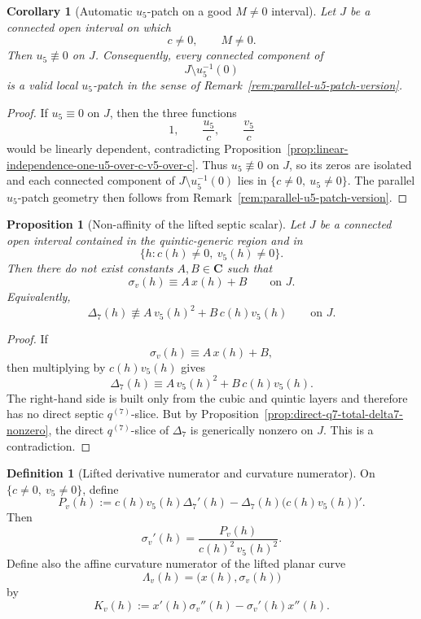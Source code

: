 \documentclass[11pt,a4paper]{amsart}
\theoremstyle{plain}
\newtheorem{proposition}[theorem]{Proposition}
\newtheorem{corollary}[theorem]{Corollary}
\theoremstyle{definition}
\newtheorem{definition}[theorem]{Definition}
\begin{document}
\begin{corollary}[Automatic $u_5$-patch on a good $M\neq 0$ interval]
\label{cor:automatic-u5-patch-on-good-M-interval}
Let $J$ be a connected open interval on which
\[
c\neq 0,
\qquad
M\neq 0.
\]
Then $u_5\not\equiv 0$ on $J$. Consequently, every connected component of
\[
J\setminus u_5^{-1}(0)
\]
is a valid local $u_5$-patch in the sense of
Remark~\ref{rem:parallel-u5-patch-version}.
\end{corollary}

\begin{proof}
If $u_5\equiv 0$ on $J$, then the three functions
\[
1,\qquad \frac{u_5}{c},\qquad \frac{v_5}{c}
\]
would be linearly dependent, contradicting
Proposition~\ref{prop:linear-independence-one-u5-over-c-v5-over-c}. Thus
$u_5\not\equiv 0$ on $J$, so its zeros are isolated and each connected
component of $J\setminus u_5^{-1}(0)$ lies in $\{c\neq 0,\ u_5\neq 0\}$.
The parallel $u_5$-patch geometry then follows from
Remark~\ref{rem:parallel-u5-patch-version}.
\end{proof}

\begin{proposition}[Non-affinity of the lifted septic scalar]
\label{prop:sigmav-not-affine-in-x}
Let $J$ be a connected open interval contained in the quintic-generic region
and in
\[
\{h:c(h)\neq 0,\ v_5(h)\neq 0\}.
\]
Then there do not exist constants $A,B\in\mathbf C$ such that
\[
\sigma_v(h)\equiv A\,x(h)+B
\qquad\text{on }J.
\]
Equivalently,
\[
\Delta_7(h)\not\equiv A\,v_5(h)^2+B\,c(h)v_5(h)
\qquad\text{on }J.
\]
\end{proposition}

\begin{proof}
If
\[
\sigma_v(h)\equiv A\,x(h)+B,
\]
then multiplying by $c(h)v_5(h)$ gives
\[
\Delta_7(h)\equiv A\,v_5(h)^2+B\,c(h)v_5(h).
\]
The right-hand side is built only from the cubic and quintic layers and
therefore has no direct septic $q^{(7)}$-slice. But by
Proposition~\ref{prop:direct-q7-total-delta7-nonzero}, the direct
$q^{(7)}$-slice of $\Delta_7$ is generically nonzero on $J$. This is a
contradiction.
\end{proof}

\begin{definition}[Lifted derivative numerator and curvature numerator]
\label{def:lifted-vpatch-derivative-and-curvature}
On $\{c\neq 0,\ v_5\neq 0\}$, define
\[
P_v(h):=c(h)v_5(h)\Delta_7'(h)-\Delta_7(h)\bigl(c(h)v_5(h)\bigr)'.
\]
Then
\[
\sigma_v'(h)=\frac{P_v(h)}{c(h)^2\,v_5(h)^2}.
\]
Define also the affine curvature numerator of the lifted planar curve
\[
\Lambda_v(h)=\bigl(x(h),\sigma_v(h)\bigr)
\]
by
\[
K_v(h):=x'(h)\sigma_v''(h)-\sigma_v'(h)x''(h).
\]
\end{definition}
\end{document}
